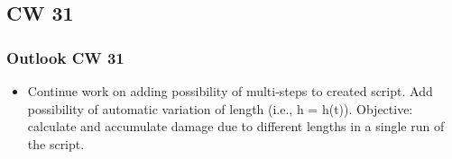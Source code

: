 \subsection{CW 31}
\begin{frame}
  \frametitle{Outlook CW 31}
	\begin{itemize}
		\item Continue work on adding possibility of multi-steps to created script. Add possibility of automatic variation of length (i.e., h = h(t)). Objective: calculate and accumulate damage due to different lengths in a single run of the script.
	\end{itemize}
\end{frame}

